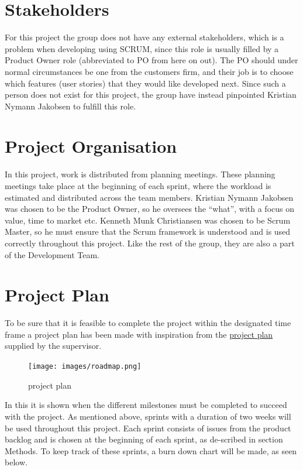 \section{Stakeholders}
For this project the group does not have any external stakeholders, which is a
problem when developing using SCRUM, since this role is usually filled by a
Product Owner role (abbreviated to PO from here on out). The PO should under
normal circumstances be one from the customers firm, and their job is to choose
which features (user stories) that they would like developed next. Since such a
person does not exist for this project, the group have instead pinpointed
Kristian Nymann Jakobsen to fulfill this role.

\section{Project Organisation}
In this project, work is distributed from planning meetings. These planning
meetings take place at the beginning of each sprint, where the workload is
estimated and distributed across the team members. Kristian Nymann Jakobsen was chosen to be the
Product Owner, so he oversees the “what”, with a focus on value, time to market
etc. Kenneth Munk Christiansen was chosen to be Scrum Master, so he must ensure that the Scrum
framework is understood and is used correctly throughout this project. Like the
rest of the group, they are also a part of the Development Team.

\section{Project Plan}
To be sure that it is feasible to complete the project within the designated
time frame a project plan has been made with inspiration from the
\href{https://docs.google.com/spreadsheets/d/1mZXxgDiwWwWpSyaQmMcafTjvXa2lQriszwTyt-Pf5BA/edit#gid=0}{project plan} supplied by the supervisor.

\begin{figure}[ht]
\centering 
\texttt{[image: images/roadmap.png]}
\label{figure:project_plan}
\caption{project plan} 
\end{figure}

In this it is shown when the different milestones must be completed to succeed
with the project. As mentioned above, sprints with a duration of two weeks will
be used throughout this project. Each sprint consists of issues from the product
backlog and is chosen at the beginning of each sprint, as de-scribed in section
Methods. To keep track of these sprints, a burn down chart will be made, as seen
below.

